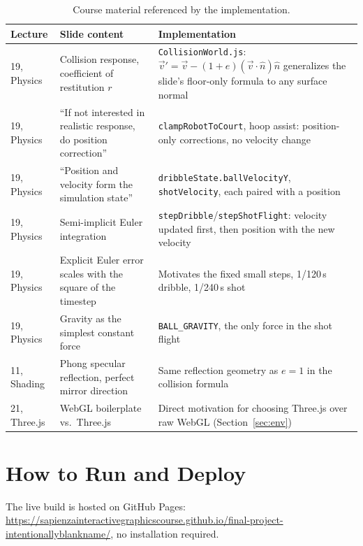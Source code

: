 \documentclass[11pt,a4paper]{article}
\newcommand{\code}[1]{\texttt{#1}}
\begin{document}
\begin{table}[htbp]
\centering
\small
\begin{tabularx}{\textwidth}{l X X}
\toprule
\textbf{Lecture} & \textbf{Slide content} & \textbf{Implementation} \\
\midrule
19, Physics & Collision response, coefficient of restitution $r$ & \code{CollisionWorld.js}: $\vec{v}' = \vec{v} - (1+e)(\vec{v}\cdot\hat{n})\hat{n}$ generalizes the slide's floor-only formula to any surface normal \\
19, Physics & ``If not interested in realistic response, do position correction'' & \code{clampRobotToCourt}, hoop assist: position-only corrections, no velocity change \\
19, Physics & ``Position and velocity form the simulation state'' & \code{dribbleState.ballVelocityY}, \code{shotVelocity}, each paired with a position \\
19, Physics & Semi-implicit Euler integration & \code{stepDribble}/\code{stepShotFlight}: velocity updated first, then position with the new velocity \\
19, Physics & Explicit Euler error scales with the square of the timestep & Motivates the fixed small steps, 1/120\,s dribble, 1/240\,s shot \\
19, Physics & Gravity as the simplest constant force & \code{BALL\_GRAVITY}, the only force in the shot flight \\
11, Shading & Phong specular reflection, perfect mirror direction & Same reflection geometry as $e=1$ in the collision formula \\
21, Three.js & WebGL boilerplate vs.\ Three.js & Direct motivation for choosing Three.js over raw WebGL (Section~\ref{sec:env}) \\
\bottomrule
\end{tabularx}
\caption{Course material referenced by the implementation.}
\label{tab:course}
\end{table}

\section{How to Run and Deploy}
\label{sec:run}

The live build is hosted on GitHub Pages:
\url{https://sapienzainteractivegraphicscourse.github.io/final-project-intentionallyblankname/}, no installation required.
\end{document}
